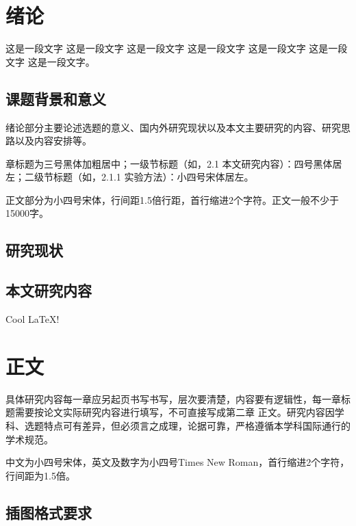 \documentclass[fontset = mac ms]{seuthesis2024b}
\begin{document}
  \chapter{绪论}
    这是一段文字
    这是一段文字
    这是一段文字
    这是一段文字
    这是一段文字
    这是一段文字
    这是一段文字。





    \section{课题背景和意义}
      绪论部分主要论述选题的意义、国内外研究现状以及本文主要研究的内容、研究思路以及内容安排等。

      章标题为三号黑体加粗居中；一级节标题（如，2.1 本文研究内容）：四号黑体居左；二级节标题（如，2.1.1 实验方法）：小四号宋体居左。

      正文部分为小四号宋体，行间距1.5倍行距，首行缩进2个字符。正文一般不少于15000字。

    \section{研究现状}

    \section{本文研究内容}

      Cool \LaTeX{}!

      \lipsum

    \chapter{正文}

      具体研究内容每一章应另起页书写书写，层次要清楚，内容要有逻辑性，每一章标题需要按论文实际研究内容进行填写，不可直接写成第二章 正文。研究内容因学科、选题特点可有差异，但必须言之成理，论据可靠，严格遵循本学科国际通行的学术规范。

      中文为小四号宋体，英文及数字为小四号Times New Roman，首行缩进2个字符，行间距为1.5倍。

    \section{插图格式要求}
\end{document}
